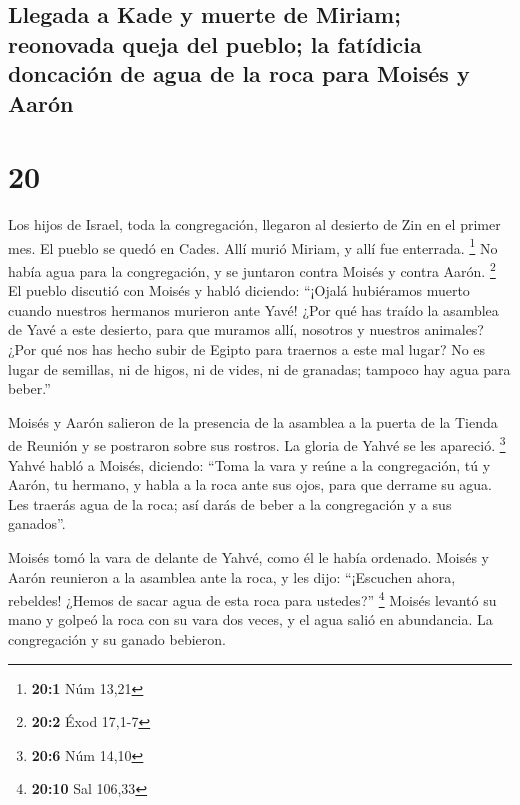 \hypertarget{llegada-a-kade-y-muerte-de-miriam-reonovada-queja-del-pueblo-la-fatuxeddicia-doncaciuxf3n-de-agua-de-la-roca-para-moisuxe9s-y-aaruxf3n}{%
\subsection{Llegada a Kade y muerte de Miriam; reonovada queja del
pueblo; la fatídicia doncación de agua de la roca para Moisés y
Aarón}\label{llegada-a-kade-y-muerte-de-miriam-reonovada-queja-del-pueblo-la-fatuxeddicia-doncaciuxf3n-de-agua-de-la-roca-para-moisuxe9s-y-aaruxf3n}}

\hypertarget{section-19}{%
\section{20}\label{section-19}}

 Los hijos de Israel, toda la congregación, llegaron al
desierto de Zin en el primer mes. El pueblo se quedó en Cades. Allí
murió Miriam, y allí fue enterrada. \footnote{\textbf{20:1} Núm 13,21}
 No había agua para la congregación, y se juntaron contra
Moisés y contra Aarón. \footnote{\textbf{20:2} Éxod 17,1-7}
 El pueblo discutió con Moisés y habló diciendo: ``¡Ojalá
hubiéramos muerto cuando nuestros hermanos murieron ante Yavé!
 ¿Por qué has traído la asamblea de Yavé a este desierto,
para que muramos allí, nosotros y nuestros animales?  ¿Por
qué nos has hecho subir de Egipto para traernos a este mal lugar? No es
lugar de semillas, ni de higos, ni de vides, ni de granadas; tampoco hay
agua para beber.''

 Moisés y Aarón salieron de la presencia de la asamblea a
la puerta de la Tienda de Reunión y se postraron sobre sus rostros. La
gloria de Yahvé se les apareció. \footnote{\textbf{20:6} Núm 14,10}
 Yahvé habló a Moisés, diciendo:  ``Toma la
vara y reúne a la congregación, tú y Aarón, tu hermano, y habla a la
roca ante sus ojos, para que derrame su agua. Les traerás agua de la
roca; así darás de beber a la congregación y a sus ganados''.

 Moisés tomó la vara de delante de Yahvé, como él le había
ordenado.  Moisés y Aarón reunieron a la asamblea ante la
roca, y les dijo: ``¡Escuchen ahora, rebeldes! ¿Hemos de sacar agua de
esta roca para ustedes?'' \footnote{\textbf{20:10} Sal 106,33}
 Moisés levantó su mano y golpeó la roca con su vara dos
veces, y el agua salió en abundancia. La congregación y su ganado
bebieron.

